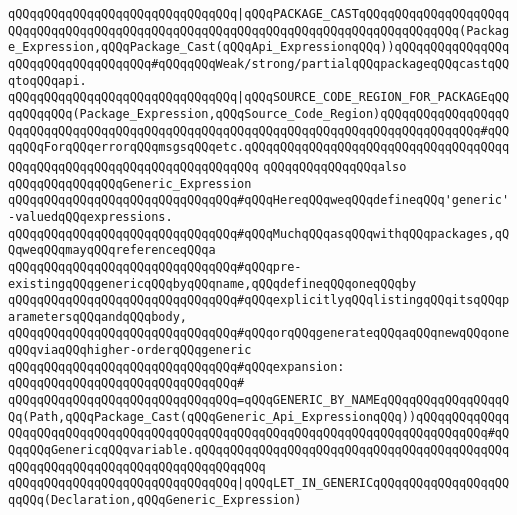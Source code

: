 \verb|qQQqqQQqqQQqqQQqqQQqqQQqqQQqqQQq|\verb#|qQQqPACKAGE_CASTqQQqqQQqqQQqqQQqqQQqqQQqqQQqqQQqqQQqqQQqqQQqqQQqqQQqqQQqqQQqqQQqqQQqqQQqqQQqqQQqqQQq(Package_Expression,qQQqPackage_Cast(qQQqApi_ExpressionqQQq))qQQqqQQqqQQqqQQqqQQqqQQqqQQqqQQqqQQq#\verb|#qQQqqQQqWeak/strong/partialqQQqpackageqQQqcastqQQqtoqQQqapi.|\newline
\verb|qQQqqQQqqQQqqQQqqQQqqQQqqQQqqQQq|\verb#|qQQqSOURCE_CODE_REGION_FOR_PACKAGEqQQqqQQqqQQq(Package_Expression,qQQqSource_Code_Region)qQQqqQQqqQQqqQQqqQQqqQQqqQQqqQQqqQQqqQQqqQQqqQQqqQQqqQQqqQQqqQQqqQQqqQQqqQQqqQQqqQQq#\verb|#qQQqqQQqForqQQqerrorqQQqmsgsqQQqetc.qQQqqQQqqQQqqQQqqQQqqQQqqQQqqQQqqQQqqQQqqQQqqQQqqQQqqQQqqQQqqQQqqQQqqQQq|\newline
\newline
\newline
\newline
\verb|qQQqqQQqqQQqqQQqalso|\newline
\verb|qQQqqQQqqQQqqQQqGeneric_Expression|\newline
\newline
\verb|qQQqqQQqqQQqqQQqqQQqqQQqqQQqqQQq#qQQqHereqQQqweqQQqdefineqQQq'generic'-valuedqQQqexpressions.|\newline
\verb|qQQqqQQqqQQqqQQqqQQqqQQqqQQqqQQq#qQQqMuchqQQqasqQQqwithqQQqpackages,qQQqweqQQqmayqQQqreferenceqQQqa|\newline
\verb|qQQqqQQqqQQqqQQqqQQqqQQqqQQqqQQq#qQQqpre-existingqQQqgenericqQQqbyqQQqname,qQQqdefineqQQqoneqQQqby|\newline
\verb|qQQqqQQqqQQqqQQqqQQqqQQqqQQqqQQq#qQQqexplicitlyqQQqlistingqQQqitsqQQqparametersqQQqandqQQqbody,|\newline
\verb|qQQqqQQqqQQqqQQqqQQqqQQqqQQqqQQq#qQQqorqQQqgenerateqQQqaqQQqnewqQQqoneqQQqviaqQQqhigher-orderqQQqgeneric|\newline
\verb|qQQqqQQqqQQqqQQqqQQqqQQqqQQqqQQq#qQQqexpansion:|\newline
\verb|qQQqqQQqqQQqqQQqqQQqqQQqqQQqqQQq#|\newline
\verb|qQQqqQQqqQQqqQQqqQQqqQQqqQQqqQQq=qQQqGENERIC_BY_NAMEqQQqqQQqqQQqqQQqqQQq(Path,qQQqPackage_Cast(qQQqGeneric_Api_ExpressionqQQq))qQQqqQQqqQQqqQQqqQQqqQQqqQQqqQQqqQQqqQQqqQQqqQQqqQQqqQQqqQQqqQQqqQQqqQQqqQQqqQQq#qQQqqQQqGenericqQQqvariable.qQQqqQQqqQQqqQQqqQQqqQQqqQQqqQQqqQQqqQQqqQQqqQQqqQQqqQQqqQQqqQQqqQQqqQQqqQQqqQQq|\newline
\verb|qQQqqQQqqQQqqQQqqQQqqQQqqQQqqQQq|\verb#|qQQqLET_IN_GENERICqQQqqQQqqQQqqQQqqQQqqQQq(Declaration,qQQqGeneric_Expression)#\newline
